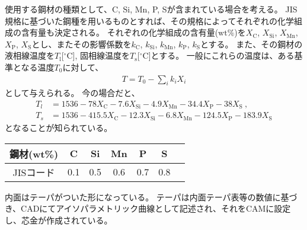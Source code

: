 


使用する鋼材の種類として、C, Si, Mn, P, Sが含まれている場合を考える。
JIS規格に基づいた鋼種を用いるものとすれば、その規格によってそれぞれの化学組成の含有量も決定される。
それぞれの化学組成の含有量($\mathrm{wt}\%$)を$X_\mathrm C$, $X_\mathrm{Si}$, $X_\mathrm{Mn}$, $X_\mathrm P$, $X_\mathrm S$とし、またその影響係数を$k_\mathrm C$, $k_\mathrm{Si}$, $k_\mathrm{Mn}$, $k_\mathrm P$, $k_\mathrm S$とする。
また、その鋼材の液相線温度を$T_\mathrm l$[$^\circ\mathrm C$], 固相線温度を$T_\mathrm s$[$^\circ\mathrm C$]とする。
一般にこれらの温度は、ある基準となる温度$T_0$に対して、
\begin{align*}
  T = T_0-\sum_i k_iX_i
\end{align*}
として与えられる。
今の場合だと、
\begin{align*}
  T_l
  &= 1536-78X_\mathrm C-7.6X_\mathrm{Si}-4.9X_\mathrm{Mn}-34.4X_\mathrm P-38X_\mathrm S~,\\
  T_s
  &= 1536-415.5X_\mathrm C-12.3X_\mathrm{Si}-6.8X_\mathrm{Mn}-124.5X_\mathrm P-183.9X_\mathrm S
\end{align*}
となることが知られている\cite{1986KO}。\\

\begin{tabular}[t]{|c|c|c|c|c|c|c|}
  \hline
  鋼材(wt\%) & C & Si & Mn & P & S
  \\\hline
  \index{JISコード}JISコード & 0.1 & 0.5 & 0.6 & 0.7 & 0.8
  \\\hline
\end{tabular}


\clearpage
内面はテーパがついた形になっている。
テーパは内面テーパ表等の数値に基づき、CADにてアイソパラメトリック曲線として記述され、それをCAMに設定し、芯金が作成されている。

